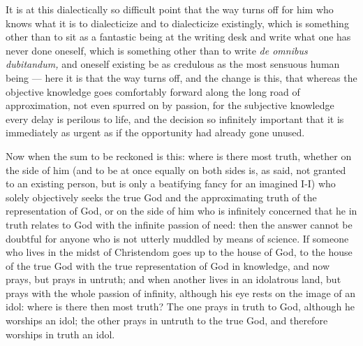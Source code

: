 \documentclass[12pt,a4paper,openany]{book}
\newcommand{\opage}[1]{\marginnote{\footnotesize\textit{[#1]}}}
\begin{document}
It is at this dialectically so difficult point that the way turns off for him who
knows what it is to dialecticize and to dialecticize existingly, which is something
other than to sit as a fantastic being at the writing desk and write what one has
never done oneself, which is something other than to write \textit{de omnibus
dubitandum,} and oneself existing be as credulous as the most sensuous human being ---
here it is that the way turns off, and the change is this, that whereas the objective
knowledge goes comfortably forward along the long road of approximation, not even
spurred on by passion, for the subjective knowledge every delay is perilous to life,
and the decision so infinitely important that it is immediately as urgent as if the
opportunity had already gone unused.

Now when the sum to be reckoned is this: where is there most truth, whether on the
side of him (and to be at once equally on both sides is, as said, not granted to an
existing person, but is only a beatifying fancy for an imagined I-I) who solely
objectively seeks the true God and the approximating truth of the representation of
God, or on the side of him who is infinitely concerned that he in truth relates to God
with the infinite passion of need: then the answer cannot be doubtful for anyone who
is not utterly muddled by means of science. If someone who lives in the midst of
Christendom goes up to the house of God, to the house of the true God with the true
representation of God in knowledge, and now prays, but prays in untruth; and when
another lives in an idolatrous land, but prays with the whole passion of infinity,
although his
\setcounter{footnote}{0}%
\opage{186}eye rests on the image of an idol: where is there then most truth? The one prays
in truth to God, although he worships an idol; the other prays in untruth to the true
God, and therefore worships in truth an idol.
\end{document}
